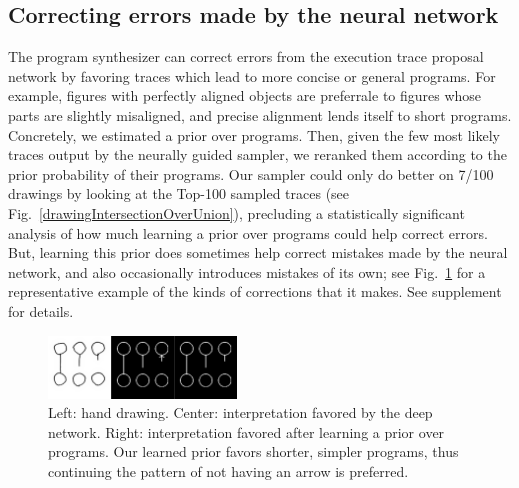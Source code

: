 \documentclass{article}
\newcommand{\probability}{\mathds{P}} %
\begin{document}
\subsection{Correcting errors made by the neural network}\label{synthesizerHelpsParsing}
The program synthesizer can correct errors from the execution
trace proposal network by favoring traces which lead to more
concise or general programs.  For example, figures with perfectly aligned objects are preferrale to figures whose parts are slightly misaligned, and precise alignment lends itself to short
programs.  Concretely, we estimated a prior over programs. Then,
given the few most likely traces output by the neurally guided sampler,
we reranked them according to the prior probability of their programs.
Our sampler could only do better on
7/100 drawings by looking at the Top-100 sampled traces
(see Fig.~\ref{drawingIntersectionOverUnion}),
precluding a statistically significant analysis of how much
learning a prior over programs could help correct errors.
But,
learning this prior does sometimes
help correct mistakes made by the neural network, and also
occasionally introduces mistakes of its own; see
Fig.~\ref{exampleOfProgramCorrectingMistake} for a representative
example of the kinds of corrections that it makes.
See supplement for details.
\begin{figure}
  \includegraphics[width = 5cm]{figures/programSuccess7.png}
  \caption{Left: hand drawing. Center: interpretation favored by the deep network. Right: interpretation favored after learning a prior over programs. Our learned prior favors shorter, simpler programs, thus continuing the pattern of not having an arrow is preferred.}\label{exampleOfProgramCorrectingMistake}
  \end{figure}


\end{document}
